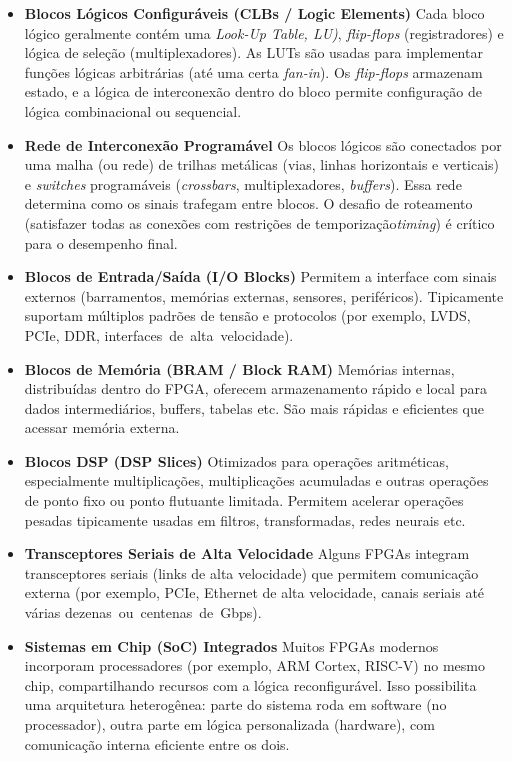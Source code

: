 \begin{itemize}
	\item \textbf{Blocos Lógicos Configuráveis (CLBs / Logic Elements)}
	Cada bloco lógico geralmente contém uma \textit{Look-Up Table, LU)}, \textit{flip-flops} (registradores) e lógica de seleção (multiplexadores). As LUTs são usadas para implementar funções lógicas arbitrárias (até uma certa \textit{fan-in}). Os \textit{flip-flops} armazenam estado, e a lógica de interconexão dentro do bloco permite configuração de lógica combinacional ou sequencial.
	
	\item \textbf{Rede de Interconexão Programável}
	Os blocos lógicos são conectados por uma malha (ou rede) de trilhas metálicas (vias, linhas horizontais e verticais) e \textit{switches} programáveis (\textit{crossbars}, multiplexadores, \textit{buffers}). Essa rede determina como os sinais trafegam entre blocos. O desafio de roteamento (satisfazer todas as conexões com restrições de temporização\textit{timing}) é crítico para o desempenho final.
	
	\item \textbf{Blocos de Entrada/Saída (I/O Blocks)}
	Permitem a interface com sinais externos (barramentos, memórias externas, sensores, periféricos). Tipicamente suportam múltiplos padrões de tensão e protocolos (por exemplo, LVDS, PCIe, DDR, \mbox{interfaces de alta velocidade).}
	
	\item \textbf{Blocos de Memória (BRAM / Block RAM)}
	Memórias internas, distribuídas dentro do FPGA, oferecem armazenamento rápido e local para dados intermediários, buffers, tabelas etc. São mais rápidas e eficientes que acessar memória externa.
	
	\item \textbf{Blocos DSP (DSP Slices)}
	Otimizados para operações aritméticas, especialmente multiplicações, multiplicações acumuladas e outras operações de ponto fixo ou ponto flutuante limitada. Permitem acelerar operações pesadas tipicamente usadas em filtros, transformadas, redes neurais etc.
	
	\item \textbf{Transceptores Seriais de Alta Velocidade}
	Alguns FPGAs integram transceptores seriais (links de alta velocidade) que permitem comunicação externa (por exemplo, PCIe, Ethernet de alta velocidade, canais seriais até várias \mbox{dezenas ou centenas de Gbps).}
	
	\item \textbf{Sistemas em Chip (SoC) Integrados}
	Muitos FPGAs modernos incorporam processadores (por exemplo, ARM Cortex, RISC-V) no mesmo chip, compartilhando recursos com a lógica reconfigurável. Isso possibilita uma arquitetura heterogênea: parte do sistema roda em software (no processador), outra parte em lógica personalizada (hardware), com comunicação interna eficiente entre os dois.
	

\end{itemize}
